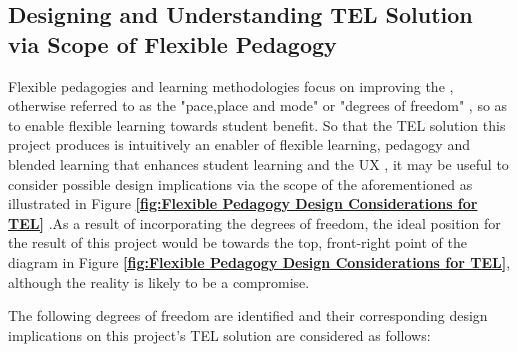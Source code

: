 \label{sec:sec01}
\subsection{Designing and Understanding TEL Solution via Scope of Flexible Pedagogy}
\label{subsec:subsec01}

Flexible pedagogies and learning methodologies focus on improving the , otherwise referred to as the "pace,place and mode" or "degrees of freedom" \cite{Gordon2014}, so as to enable flexible learning towards student benefit. So that the TEL solution this project produces is intuitively an enabler of flexible learning, pedagogy and blended learning that enhances student learning and the UX \cite{Cubukcuo2012,Gordon2014,Team2008}, it may be useful to consider possible design implications via the scope of the aforementioned as illustrated in Figure \textbf{\ref{fig:Flexible Pedagogy Design Considerations for TEL}} \cite{Gordon2014}.As a result of incorporating the degrees of freedom, the ideal position for the result of this project would be towards the top, front-right point of the diagram in Figure \textbf{\ref{fig:Flexible Pedagogy Design Considerations for TEL}}, although the reality is likely to be a compromise.

The following degrees of freedom are identified and their corresponding design implications on this project's TEL solution are considered as follows:

